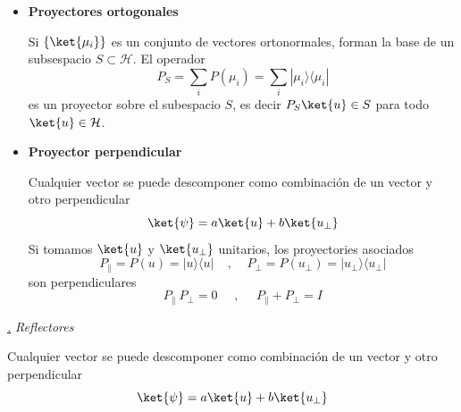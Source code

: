 \documentclass[a4paper,11pt]{book} %
\numberwithin{equation}{chapter}
\newcommand{\ketbra}[2]{| #1\rangle \! \langle #2|}
\def\subsubiContadorIt{\par\addtocounter{subsubsection}{1}\underline{\it\thesubsubsection.}\hskip0.5cm \setcounter{subsubsubsectionIt}{0}}
\newcommand{\SubsubiIt}[1]{
		\subsubiContadorIt \textit{#1}
	}
\newcounter{subsubsubsectionIt}[subsubsection]
\begin{document}
\begin{itemize}
	\item \textbf{Proyectores ortogonales}
	
	Si $\{\ket{\mu_i}\}$ es un conjunto de vectores ortonormales, forman la base de un subsespacio $S\subset \mathcal{H}$. El operador 
	\begin{equation}
	P_S = \sum_i P(\mu_i) = \sum_i \ketbra{\mu_i}{\mu_i}
	\end{equation}
es un proyector sobre el subespacio $S$, es decir $P_S\ket{u}\in S$ para todo $\ket{u}\in \mathcal{H}$.

	\item \textbf{Proyector perpendicular}
	
	Cualquier vector se puede descomponer como combinación de un vector y otro perpendicular
	\begin{equation}
	\ket{\psi} = a \ket{u} + b \ket{u_\perp}
	\end{equation}
	Si tomamos $\ket{u}$ y $\ket{u_\perp}$ unitarios, los proyectories asociados 
		\begin{equation}
		P_\| = P(u)  = \ketbra{u}{u}~~~~~,~~~~~P_\perp = P(u_\perp)= \ketbra{u_\perp}{u_\perp}
		\end{equation}
son perpendiculares
	\begin{equation}
	P_\|\ P_\perp = 0  ~~~~~~,~~~~~~P_\| + P_\perp = I
	\end{equation}

\end{itemize}

			\SubsubiIt{Reflectores}

Cualquier vector se puede descomponer como combinación de un vector y otro perpendicular
	\begin{equation}
	\ket{\psi} = a \ket{u} + b \ket{u_\perp}
	\end{equation}
\end{document}
